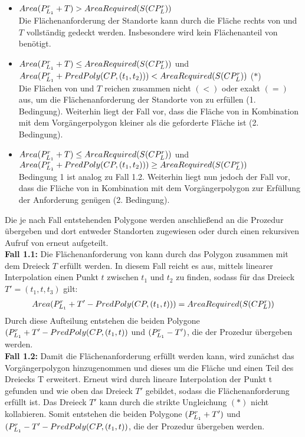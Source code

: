 \documentclass[ngerman]{seminarbeitrag}
\begin{document}
\begin{itemize}
\item $Area(P_{L_{1}}^{r} + T) > AreaRequired(S(CP_{L}^{r}))$ \\
Die Flächenanforderung der Standorte kann durch die Fläche rechts von \leins und $T$ vollständig gedeckt werden. Insbesondere wird kein Flächenanteil von  benötigt. 
\item $Area(P_{L_{1}}^{r} +T) \le AreaRequired(S(CP_{L}^{r}))$ und \\ $Area(P_{L_{1}}^{r}+PredPoly(CP,(t_{1},t_{2})))<AreaRequired(S(CP_{L}^{r}))$ \hfill ($\ast$) \\
Die Flächen von \prleins und $T$ reichen zusammen nicht $(<)$ oder exakt $(=)$ aus, um die Flächenanforderung der Standorte von \cprl zu erfüllen (1. Bedingung). Weiterhin liegt der Fall vor, dass die Fläche von \prleins in Kombination mit dem Vorgängerpolygon  kleiner als die geforderte Fläche ist (2. Bedingung).
\item $Area(P_{L_{1}}^{r} +T) \le AreaRequired(S(CP_{L}^{r}))$ und \\ $Area(P_{L_{1}}^{r}+PredPoly(CP,(t_{1},t_{2})))\ge AreaRequired(S(CP_{L}^{r}))$ \\
Bedingung 1 ist analog zu Fall 1.2. Weiterhin liegt nun jedoch der Fall vor, dass die Fläche von \prleins in Kombination mit dem Vorgängerpolygon  zur Erfüllung der Anforderung genügen (2. Bedingung).
\end{itemize}

Die je nach Fall entstehenden Polygone werden anschließend an die Prozedur \daa übergeben und dort entweder Standorten zugewiesen oder durch einen rekursiven Aufruf von \noncon erneut aufgeteilt.\\

\textbf{Fall 1.1:} Die Flächenanforderung von \s{\mcprl} kann durch das Polygon \prleins zusammen mit dem Dreieck $T$ erfüllt werden. In diesem Fall reicht es aus, mittels linearer Interpolation einen Punkt $t$ zwischen $t_{1}$ und $t_{2}$ zu finden, sodass für das Dreieck $T' = (t_{1}, t, t_{3})$ gilt: \\
\begin{align*}Area(P_{L_{1}}^{r}+T'-PredPoly(CP,(t_{1},t)))=AreaRequired(S(CP_{L}^{r})) \end{align*}
Durch diese Aufteilung entstehen die beiden Polygone $(P_{L_{1}}^{r} + T' - PredPoly(CP,(t_{1},t))$ und \hbox{$(P_{L_{1}}^{r} -T')$}, die der Prozedur \daa übergeben werden.\\

\textbf{Fall 1.2:} Damit die Flächenanforderung erfüllt werden kann, wird zunächst das Vorgängerpolygon  hinzugenommen und dieses um die Fläche \prleins und einen Teil des Dreiecks T erweitert. Erneut wird durch lineare Interpolation der Punkt t gefunden und wie oben das Dreieck $T'$ gebildet, sodass die Flächenanforderung erfüllt ist. Das Dreieck $T'$ kann durch die strikte Ungleichung $(\ast)$ nicht kollabieren. Somit entstehen die beiden Polygone $(P_{L_{1}}^{r} + T')$ und $(P_{L_{1}}^{r} - T' - PredPoly(CP,(t_{1},t))$, die der Prozedur \daa übergeben werden.\\
\end{document}
